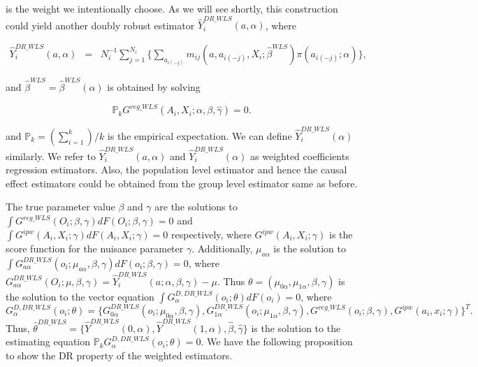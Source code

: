 \documentclass[oupdraft]{biostatistics}
\begin{document}
\noindent is the weight we intentionally choose. As we will see shortly, this construction could yield another doubly robust estimator $\widehat{Y}_i^{DR\_WLS}(a,\alpha)$, where

\vspace{-0.8cm}
\begin{eqnarray*}\label{eq: DR_WLS_estimator}
  \widehat{Y}_i^{DR\_WLS}(a,\alpha)&=&N_i^{-1}\sum_{j=1}^{N_i}\Biggl\{\sum_{a_{i(-j)}}m_{ij}(a,a_{i(-j)},X_i;\hat\beta^{WLS})\pi(a_{i(-j)};\alpha)
 \Biggr\},
 \end{eqnarray*}

\noindent and $\hat\beta^{WLS}=\hat\beta^{WLS}(\alpha)$ is obtained by solving 

\begin{equation}\label{eq: ee_DR_WLS}
\mathds{P}_kG^{reg\_WLS}(A_i,X_i;\alpha,\beta,\hat\gamma)=0.
\end{equation}

\noindent and $\mathds{P}_k=(\sum_{i=1}^k)/k$ is the empirical expectation. We can define $\widehat{Y}_i^{DR\_WLS}(\alpha)$ similarly. We refer to $\widehat{Y}_i^{DR\_WLS}(a,\alpha)$ and $\widehat{Y}_i^{DR\_WLS}(\alpha)$ as weighted coefficients regression estimators. Also, the population level estimator and hence the causal effect estimators could be obtained from the group level estimator same as before. 


The true parameter value $\beta$ and $\gamma$ are the solutions to $\int G^{reg\_WLS}(O_i;\beta,\gamma)dF(O_i;\beta,\gamma)=0$ and $\int G^{ipw}(A_i,X_i;\gamma)dF(A_i,X_i;\gamma)=0$ respectively, where  $G^{ipw}(A_i,X_i;\gamma)$ is the score function for the nuisance parameter $\gamma$. Additionally, $\mu_{a\alpha}$ is the solution to $\int G^{DR\_WLS}_{a\alpha}(o_i;\mu_{a\alpha},\beta,\gamma) dF(o_i;\beta,\gamma) = 0$, where $G^{DR\_WLS}_{a\alpha}(O_i;\mu,\beta,\gamma) =\widehat{Y}_i^{DR\_WLS}(a;\alpha,\beta,\gamma)- \mu$.  Thus $\theta=(\mu_{0\alpha},\mu_{1\alpha},\beta,\gamma)$ is the solution to the vector equation $\int G^{ D, DR\_WLS}_{\alpha}(o_i;\theta) dF(o_i) = 0$, where $$G^{ D,DR\_WLS}_{\alpha}(o_i;\theta) = \{G^{DR\_WLS}_{0\alpha}(o_i;\mu_{0\alpha},\beta,\gamma),G^{DR\_WLS}_{1\alpha}(o_i;\mu_{1\alpha},\beta,\gamma),G^{reg\_WLS}(o_i;\beta,\gamma),G^{ipw}(a_i,x_i;\gamma)\}^T.$$ Thus, $\hat \theta^{DR\_WLS}=\{\hat Y^{DR\_WLS}(0,\alpha),\hat Y^{DR\_WLS}(1,\alpha),\hat\beta,\hat\gamma\}$ is the solution to the estimating equation $\mathds{P}_k G^{D,DR\_WLS}_{\alpha}(o_i;\theta)=0$. We have the following proposition to show the DR property of the weighted estimators.
\end{document}
